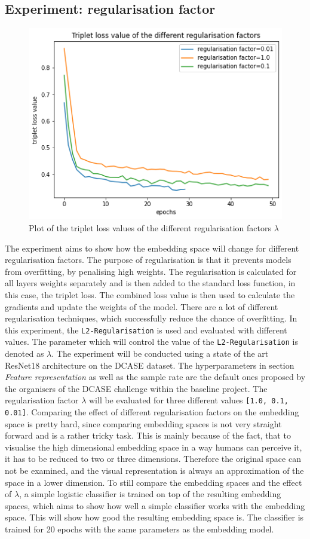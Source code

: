 \subsection{Experiment: regularisation factor}
\begin{figure}[ht]
\centering
    \includegraphics[width=0.5\linewidth]{study-doc/experiment_regularisation/assets/triplet_loss.png}
    \caption{Plot of the triplet loss values of the different regularisation factors $\lambda$}
    \label{fig:plot-triplet-loss}
\end{figure}
\noindent
The experiment aims to show how the embedding space will change for different regularisation factors. The purpose of regularisation is that it prevents models from overfitting, by penalising high weights. The regularisation is calculated for all layers weights separately and is then added to the standard loss function, in this case, the triplet loss. The combined loss value is then used to calculate the gradients and update the weights of the model. There are a lot of different regularisation techniques, which successfully reduce the chance of overfitting. In this experiment, the \texttt{L2-Regularisation} is used and evaluated with different values. The parameter which will control the value of the \texttt{L2-Regularisation} is denoted as $\lambda$.
\newline
\newline
The experiment will be conducted using a state of the art ResNet18 architecture on the DCASE dataset. The hyperparameters in section \textit{Feature representation} as well as the sample rate are the default ones proposed by the organisers of the DCASE challenge within the baseline project. The regularisation factor $\lambda$ will be evaluated for three different values \texttt{[1.0, 0.1, 0.01]}.
\newline
\newline
Comparing the effect of different regularisation factors on the embedding space is pretty hard, since comparing embedding spaces is not very straight forward and is a rather tricky task. This is mainly because of the fact, that to visualise the high dimensional embedding space in a way humans can perceive it, it has to be reduced to two or three dimensions. Therefore the original space can not be examined, and the visual representation is always an approximation of the space in a lower dimension. To still compare the embedding spaces and the effect of $\lambda$, a simple logistic classifier is trained on top of the resulting embedding spaces, which aims to show how well a simple classifier works with the embedding space. This will show how good the resulting embedding space is. The classifier is trained for 20 epochs with the same parameters as the embedding model.
